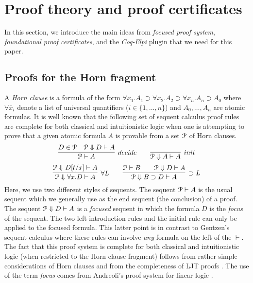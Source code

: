 
\section{Proof theory and proof certificates}
\label{sec:three}

In this section, we introduce the main ideas from \emph{focused proof
  system}, \emph{foundational proof certificates}, and the
\emph{Coq-Elpi} plugin that we need for this paper.

\subsection{Proofs for the Horn fragment}
\label{ssec:focused}


A \emph{Horn clause} is a formula of the form $\forall \bar
x_1. A_1\supset \forall \bar x_2. A_2\supset \forall \bar
x_n. A_n\supset A_0$ where $\forall\bar x_i$ denote a list of
universal quantifiers ($i\in\{1,\ldots,n\}$) and $A_0,\ldots,A_n$ are
atomic formulas.  It is well known that the following set of sequent
calculus proof rules are complete for both classical and
intuitionistic logic when one is attempting to prove that a given
atomic formula $A$ is provable from a  set ${\mathcal P}$ of Horn
clauses. 
\[
  \infer[decide]{\Pscr\vdash A}
                {D \in \Pscr\quad \Pscr\Downarrow D\vdash A}
  \qquad
  \infer[init]{\Pscr\Downarrow A\vdash A}{}
\]
\[
  \infer[\forall L]{\Pscr\Downarrow\forall x. D\vdash A}
        {\Pscr\Downarrow D[t/x]\vdash A}
  \qquad
  \infer[\supset L]{\Pscr\Downarrow B\supset D\vdash A}
        {\Pscr\vdash B\qquad \Pscr\Downarrow D\vdash A}
\]
Here, we use two different styles of sequents.  The sequent
${\mathcal P}\vdash A$ is the usual sequent which we generally use as the end
sequent (the conclusion) of a proof.  The sequent ${\mathcal P}\Downarrow
D\vdash A$ is a \emph{focused} sequent in which the formula $D$ is the
\emph{focus} of the sequent.  The two left introduction rules and the
initial rule can only be applied to the focused formula.  This latter
point is in contrast to Gentzen's sequent calculus where these rules
can involve \emph{any} formula on the left of the $\vdash$.  The fact
that this proof system is complete for both classical and
intuitionistic logic (when restricted to the Horn clause fragment)
follows from rather simple considerations of Horn clauses
\cite{nadathur90jacm} and from the completeness of LJT proofs
\cite{Herbelin94}.  The use of the term \emph{focus} comes from
Andreoli's proof system for linear logic \cite{andreoli92jlc}.

